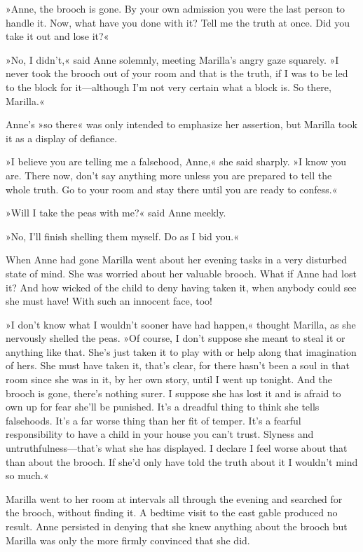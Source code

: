 »Anne, the brooch is gone. By your own admission you were the last person to handle it. Now, what have you done with it? Tell me the truth at once. Did you take it out and lose it?«

»No, I didn’t,« said Anne solemnly, meeting Marilla’s angry gaze squarely. »I never took the brooch out of your room and that is the truth, if I was to be led to the block for it—although I’m not very certain what a block is. So there, Marilla.«

Anne’s »so there« was only intended to emphasize her assertion, but Marilla took it as a display of defiance.

»I believe you are telling me a falsehood, Anne,« she said sharply. »I know you are. There now, don’t say anything more unless you are prepared to tell the whole truth. Go to your room and stay there until you are ready to confess.«

»Will I take the peas with me?« said Anne meekly.

»No, I’ll finish shelling them myself. Do as I bid you.«

When Anne had gone Marilla went about her evening tasks in a very disturbed state of mind. She was worried about her valuable brooch. What if Anne had lost it? And how wicked of the child to deny having taken it, when anybody could see she must have! With such an innocent face, too!

»I don’t know what I wouldn’t sooner have had happen,« thought Marilla, as she nervously shelled the peas. »Of course, I don’t suppose she meant to steal it or anything like that. She’s just taken it to play with or help along that imagination of hers. She must have taken it, that’s clear, for there hasn’t been a soul in that room since she was in it, by her own story, until I went up tonight. And the brooch is gone, there’s nothing surer. I suppose she has lost it and is afraid to own up for fear she’ll be punished. It’s a dreadful thing to think she tells falsehoods. It’s a far worse thing than her fit of temper. It’s a fearful responsibility to have a child in your house you can’t trust. Slyness and untruthfulness—that’s what she has displayed. I declare I feel worse about that than about the brooch. If she’d only have told the truth about it I wouldn’t mind so much.«

Marilla went to her room at intervals all through the evening and searched for the brooch, without finding it. A bedtime visit to the east gable produced no result. Anne persisted in denying that she knew anything about the brooch but Marilla was only the more firmly convinced that she did.

